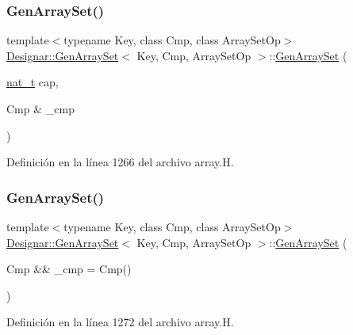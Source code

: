\subsubsection{\texorpdfstring{Gen\+Array\+Set()}{GenArraySet()}\hspace{0.1cm}{\footnotesize\ttfamily [1/6]}}
{\footnotesize\ttfamily template$<$typename Key, class Cmp, class Array\+Set\+Op$>$ \\
\hyperlink{class_designar_1_1_gen_array_set}{Designar\+::\+Gen\+Array\+Set}$<$ Key, Cmp, Array\+Set\+Op $>$\+::\hyperlink{class_designar_1_1_gen_array_set}{Gen\+Array\+Set} (\begin{DoxyParamCaption}\item[{\hyperlink{namespace_designar_aa72662848b9f4815e7bf31a7cf3e33d1}{nat\+\_\+t}}]{cap,  }\item[{Cmp \&}]{\+\_\+cmp }\end{DoxyParamCaption})\hspace{0.3cm}{\ttfamily [inline]}}



Definición en la línea 1266 del archivo array.\+H.

\mbox{\label{class_designar_1_1_gen_array_set_a6dd76e1d1ccb49b3e984c18b05c98dd2}} 
\subsubsection{\texorpdfstring{Gen\+Array\+Set()}{GenArraySet()}\hspace{0.1cm}{\footnotesize\ttfamily [2/6]}}
{\footnotesize\ttfamily template$<$typename Key, class Cmp, class Array\+Set\+Op$>$ \\
\hyperlink{class_designar_1_1_gen_array_set}{Designar\+::\+Gen\+Array\+Set}$<$ Key, Cmp, Array\+Set\+Op $>$\+::\hyperlink{class_designar_1_1_gen_array_set}{Gen\+Array\+Set} (\begin{DoxyParamCaption}\item[{Cmp \&\&}]{\+\_\+cmp = {\ttfamily Cmp()} }\end{DoxyParamCaption})\hspace{0.3cm}{\ttfamily [inline]}}



Definición en la línea 1272 del archivo array.\+H.

